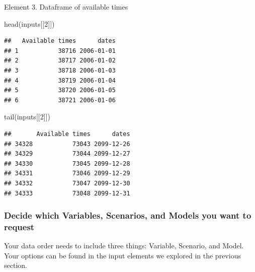 \documentclass[
  paper=a4,
  ,captions=tableheading
]{scrartcl}
\newenvironment{Shaded}{\begin{snugshade}}{\end{snugshade}}
\newcommand{\DecValTok}[1]{\textcolor[rgb]{0.00,0.00,0.81}{#1}}
\newcommand{\FunctionTok}[1]{\textcolor[rgb]{0.00,0.00,0.00}{#1}}
\newcommand{\NormalTok}[1]{#1}
\begin{document}
Element 3. Dataframe of available times

\begin{Shaded}
\begin{Highlighting}[]
\FunctionTok{head}\NormalTok{(inputs[[}\DecValTok{2}\NormalTok{]])}
\end{Highlighting}
\end{Shaded}

\begin{verbatim}
##   Available times      dates
## 1           38716 2006-01-01
## 2           38717 2006-01-02
## 3           38718 2006-01-03
## 4           38719 2006-01-04
## 5           38720 2006-01-05
## 6           38721 2006-01-06
\end{verbatim}

\begin{Shaded}
\begin{Highlighting}[]
\FunctionTok{tail}\NormalTok{(inputs[[}\DecValTok{2}\NormalTok{]])}
\end{Highlighting}
\end{Shaded}

\begin{verbatim}
##       Available times      dates
## 34328           73043 2099-12-26
## 34329           73044 2099-12-27
## 34330           73045 2099-12-28
## 34331           73046 2099-12-29
## 34332           73047 2099-12-30
## 34333           73048 2099-12-31
\end{verbatim}

\hypertarget{decide-which-variables-scenarios-and-models-you-want-to-request}{%
\subsubsection{Decide which Variables, Scenarios, and Models you want to
request}\label{decide-which-variables-scenarios-and-models-you-want-to-request}}

Your data order needs to include three things: Variable, Scenario, and
Model. Your options can be found in the input elements we explored in
the previous section.
\end{document}
